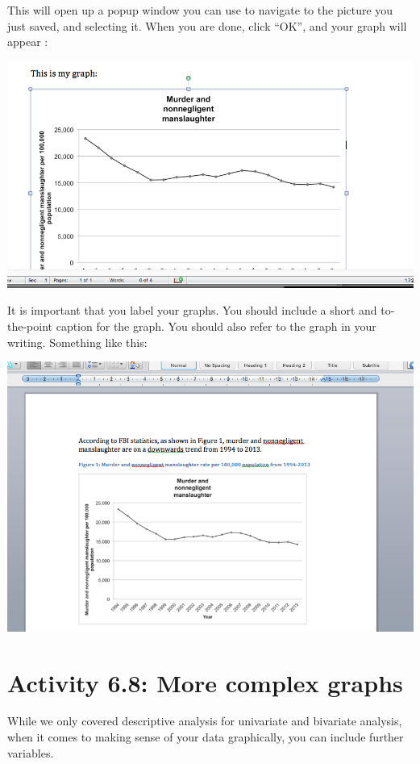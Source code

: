 \documentclass[
]{book}
\begin{document}
This will open up a popup window you can use to navigate to the picture you just saved, and selecting it. When you are done, click ``OK'', and your graph will appear :

\includegraphics{imgs/inserted_graph.png}

It is important that you label your graphs. You should include a short and to-the-point caption for the graph. You should also refer to the graph in your writing. Something like this:

\includegraphics{imgs/ref_and_caption.png}

\hypertarget{activity-6.8-more-complex-graphs}{%
\section{Activity 6.8: More complex graphs}\label{activity-6.8-more-complex-graphs}}

While we only covered descriptive analysis for univariate and bivariate analysis, when it comes to making sense of your data graphically, you can include further variables.
\end{document}
